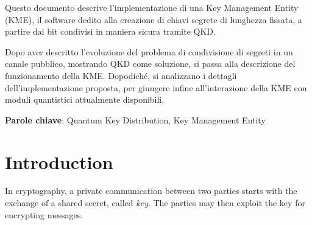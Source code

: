 \documentclass{Configuration_Files/PoliMi3i_thesis}
\begin{document}
Questo documento descrive l'implementazione di una Key Management Entity (KME), il software dedito alla creazione di chiavi segrete di lunghezza fissata, a partire dai bit condivisi in maniera sicura tramite QKD.

Dopo aver descritto l'evoluzione del problema di condivisione di segreti in un canale pubblico, mostrando QKD come soluzione, si passa alla descrizione del funzionamento della KME. Dopodiché, si analizzano i dettagli dell'implementazione proposta, per giungere infine all'interazione della KME con moduli quantistici attualmente disponibili.

\textbf{Parole chiave}: Quantum Key Distribution, Key Management Entity


\thispagestyle{empty}
\tableofcontents %
\thispagestyle{empty}
\cleardoublepage

%
%
%    
%

\mainmatter %


\chapter*{Introduction}
In cryptography, a private communication between two parties starts with the exchange of a shared secret, called \textit{key}. The parties may then exploit the key for encrypting messages.
\end{document}
